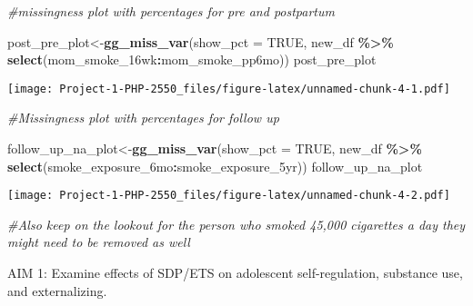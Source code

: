 \documentclass[
]{article}
\newenvironment{Shaded}{\begin{snugshade}}{\end{snugshade}}
\newcommand{\AttributeTok}[1]{\textcolor[rgb]{0.13,0.29,0.53}{#1}}
\newcommand{\CommentTok}[1]{\textcolor[rgb]{0.56,0.35,0.01}{\textit{#1}}}
\newcommand{\ConstantTok}[1]{\textcolor[rgb]{0.56,0.35,0.01}{#1}}
\newcommand{\FunctionTok}[1]{\textcolor[rgb]{0.13,0.29,0.53}{\textbf{#1}}}
\newcommand{\NormalTok}[1]{#1}
\newcommand{\OtherTok}[1]{\textcolor[rgb]{0.56,0.35,0.01}{#1}}
\newcommand{\SpecialCharTok}[1]{\textcolor[rgb]{0.81,0.36,0.00}{\textbf{#1}}}
\begin{document}
\begin{Shaded}
\begin{Highlighting}[]
\CommentTok{\#missingness plot with percentages for pre and postpartum }

\NormalTok{post\_pre\_plot}\OtherTok{\textless{}{-}}\FunctionTok{gg\_miss\_var}\NormalTok{(}\AttributeTok{show\_pct =} \ConstantTok{TRUE}\NormalTok{, new\_df }\SpecialCharTok{\%\textgreater{}\%}
             \FunctionTok{select}\NormalTok{(mom\_smoke\_16wk}\SpecialCharTok{:}\NormalTok{mom\_smoke\_pp6mo))}
\NormalTok{post\_pre\_plot}
\end{Highlighting}
\end{Shaded}

\texttt{[image: Project-1-PHP-2550\_files/figure-latex/unnamed-chunk-4-1.pdf]}

\begin{Shaded}
\begin{Highlighting}[]
\CommentTok{\#Missingness plot with percentages for follow up}

\NormalTok{follow\_up\_na\_plot}\OtherTok{\textless{}{-}}\FunctionTok{gg\_miss\_var}\NormalTok{(}\AttributeTok{show\_pct =} \ConstantTok{TRUE}\NormalTok{, new\_df }\SpecialCharTok{\%\textgreater{}\%}
             \FunctionTok{select}\NormalTok{(smoke\_exposure\_6mo}\SpecialCharTok{:}\NormalTok{smoke\_exposure\_5yr))}
\NormalTok{follow\_up\_na\_plot}
\end{Highlighting}
\end{Shaded}

\texttt{[image: Project-1-PHP-2550\_files/figure-latex/unnamed-chunk-4-2.pdf]}

\begin{Shaded}
\begin{Highlighting}[]
\CommentTok{\#Also keep on the lookout for the person who smoked 45,000 cigarettes a day they might need to be removed as well}
\end{Highlighting}
\end{Shaded}

AIM 1: Examine effects of SDP/ETS on adolescent self-regulation,
substance use, and externalizing.
\end{document}

